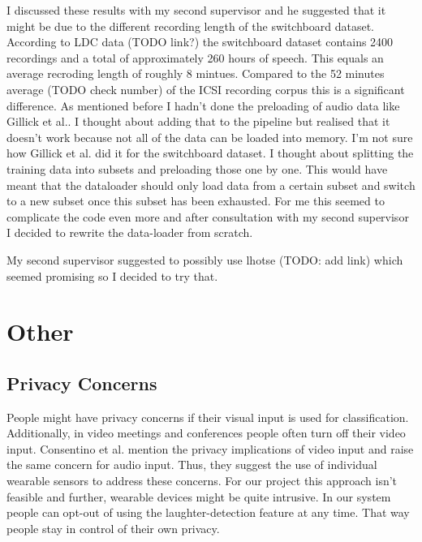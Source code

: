 \documentclass[bsc,frontabs,parskip,deptreport]{infthesis}
\begin{document}
I discussed these results with my second supervisor and he suggested that it might be due to the different recording length of the switchboard dataset. According to LDC data (TODO link?) the switchboard dataset contains 2400 recordings and a total of approximately 260 hours of speech. This equals an average recroding length of roughly 8 mintues. Compared to the 52 minutes average (TODO check number) of the ICSI recording corpus this is a significant difference. 
As mentioned before I hadn't done the preloading of audio data like Gillick et al.. I thought about adding that to the pipeline but realised that it doesn't work because not all of the data can be loaded into memory. I'm not sure how Gillick et al. did it for the switchboard dataset. I thought about splitting the training data into subsets and preloading those one by one. This would have meant that the dataloader should only load data from a certain subset and switch to a new subset once this subset has been exhausted. 
For me this seemed to complicate the code even more and after consultation with my second supervisor I decided to rewrite the data-loader from scratch. 

My second supervisor suggested to possibly use lhotse (TODO: add link) which seemed promising so I decided to try that. 







\chapter{Other}
\section{Privacy Concerns}\label{privacy-concerns}
People might have privacy concerns if their visual input is used for classification.
Additionally, in video meetings and conferences people often turn off their video input.
Consentino et al. \cite{cosentino2016quantitative}  mention the privacy implications of video input and raise the same concern for audio input.
Thus, they suggest the use of individual wearable sensors to address these concerns.
For our project this approach isn't feasible and further, wearable devices might be quite intrusive.
In our system people can opt-out of using the laughter-detection feature at any time.
That way people stay in control of their own privacy.




%
%
%
\end{document}
